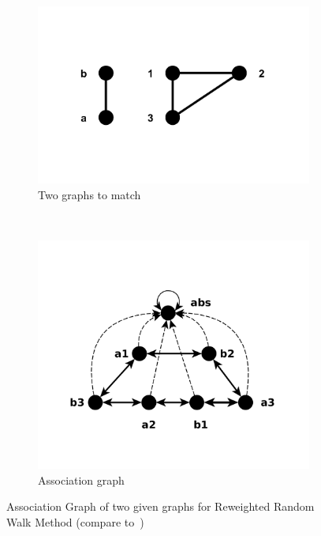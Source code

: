 \begin{figure}[h] %
	\centering
    \begin{subfigure}[b]{0.33\textwidth}
        \includegraphics[width=\textwidth]{chapter1/fig/RRWM1}
        \caption{Two graphs to match}
        \label{fig:RRWM1} 
    \end{subfigure}
    ~
    \begin{subfigure}[b]{0.33\textwidth}
        \includegraphics[width=\textwidth]{chapter1/fig/RRWM2}
        \caption{Association graph}
        \label{fig:RRWM2} 
    \end{subfigure}   
\caption{Association Graph of two given graphs for Reweighted Random Walk Method (compare to~\cite{Cho2010_RRWM})}
\end{figure}
